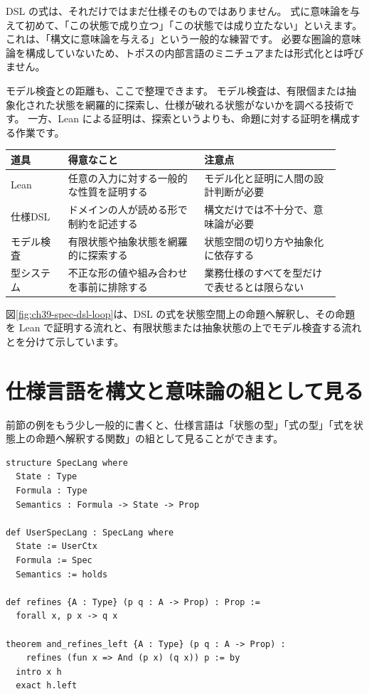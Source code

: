 DSL の式は、それだけではまだ仕様そのものではありません。
式に意味論を与えて初めて、「この状態で成り立つ」「この状態では成り立たない」といえます。
これは、「構文に意味論を与える」という一般的な練習です。
必要な圏論的意味論を構成していないため、トポスの内部言語のミニチュアまたは形式化とは呼びません。

モデル検査との距離も、ここで整理できます。
モデル検査は、有限個または抽象化された状態を網羅的に探索し、仕様が破れる状態がないかを調べる技術です。
一方、Lean による証明は、探索というよりも、命題に対する証明を構成する作業です。

\begin{center}
\begin{tabular}{@{}p{0.16\linewidth}p{0.38\linewidth}p{0.38\linewidth}@{}}
\toprule
道具 & 得意なこと & 注意点 \\
\midrule
Lean & 任意の入力に対する一般的な性質を証明する & モデル化と証明に人間の設計判断が必要 \\
仕様DSL & ドメインの人が読める形で制約を記述する & 構文だけでは不十分で、意味論が必要 \\
モデル検査 & 有限状態や抽象状態を網羅的に探索する & 状態空間の切り方や抽象化に依存する \\
型システム & 不正な形の値や組み合わせを事前に排除する & 業務仕様のすべてを型だけで表せるとは限らない \\
\bottomrule
\end{tabular}
\end{center}


図\ref{fig:ch39-spec-dsl-loop}は、DSL の式を状態空間上の命題へ解釈し、その命題を Lean で証明する流れと、有限状態または抽象状態の上でモデル検査する流れとを分けて示しています。

\section{仕様言語を構文と意味論の組として見る}

前節の例をもう少し一般的に書くと、仕様言語は「状態の型」「式の型」「式を状態上の命題へ解釈する関数」の組として見ることができます。

\begin{listing}[htbp]
\begin{verbatim}
structure SpecLang where
  State : Type
  Formula : Type
  Semantics : Formula -> State -> Prop

def UserSpecLang : SpecLang where
  State := UserCtx
  Formula := Spec
  Semantics := holds

def refines {A : Type} (p q : A -> Prop) : Prop :=
  forall x, p x -> q x

theorem and_refines_left {A : Type} (p q : A -> Prop) :
    refines (fun x => And (p x) (q x)) p := by
  intro x h
  exact h.left
\end{verbatim}
\caption{\texttt{SpecLang}・\texttt{refines}・\texttt{and\_refines\_left}}
\label{lst:ch39_spec_lang}
\end{listing}

